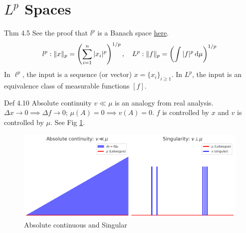 \setcounter{section}{3}
\section{\texorpdfstring{$L^p$}{Lp} Spaces}

\begin{note}{Thm 4.5}
    See the proof that $l^p$ is a Banach space \href{https://tech.dafuzhu.com/courses/mit18102/a1/#problem-2}{here}. 
    \[
    l^p: \|x\|_p=\left(
    \sum_{i=1}^n |x_i|^p
    \right)^{1/p},\quad L^p:\|f\|_p=\left(
    \int |f|^p \mathop{}\!\mathrm{d} \mu
    \right)^{1/p}
    \]
    In \( \ell^{p} \), the input is a sequence (or vector) \( x=\{x_{i}\}_{i \geq 1} \). In \( L^{p} \), the input is an equivalence class of measurable functions \( [f] \).
\end{note}

\begin{note}{Def 4.10}
    Absolute continuity $v\ll \mu$ is an analogy from real analysis. $\Delta x\to 0\implies \Delta f\to 0$; $\mu(A)=0\implies v(A)=0$. $f$ is controlled by $x$ and $v$ is controlled by $\mu$. See Fig \ref{fig:def4.10}.
    \begin{figure}[htbp]
        \centering
        \includegraphics[width=0.65\linewidth]{fig/def4-10.png}
        \caption{Absolute continuous and Singular}
        \label{fig:def4.10}
    \end{figure}
\end{note}

